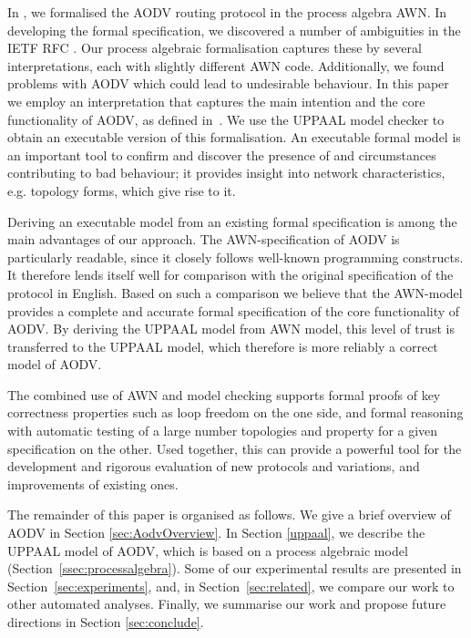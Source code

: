\documentclass[conference,twoside]{IEEEtran}
\newcommand{\awn}{AWN\xspace}
\begin{document}
In \cite{TR11}, we formalised the AODV routing protocol in the process algebra \awn.
In developing the formal specification, we
discovered a number of ambiguities in the IETF RFC \cite{rfc3561}.
Our process algebraic formalisation captures these by several
interpretations, each with slightly different {\awn} code.
Additionally, we found problems with AODV which could lead to undesirable behaviour.
In this paper we employ an interpretation that captures the main intention and
the core functionality of AODV, as defined in~\cite{rfc3561}.
We use the UPPAAL model checker to obtain an executable version of this formalisation.
An executable formal model is  an important tool to confirm and
 discover the presence of and circumstances contributing to  bad behaviour;
it provides insight into network characteristics, e.g. topology forms, which give rise to it.

Deriving an executable model from an existing formal specification is among the
main advantages of our approach.
The {\awn}-specification of AODV is particularly readable, since it  closely
 follows well-known programming constructs. It therefore lends itself
 well for comparison with the original specification of the protocol
 in English.  Based on such a comparison we believe that
 the \awn-model provides a complete and accurate formal
specification of the core functionality of AODV\@.
 By deriving the UPPAAL model from \awn model, this level of trust is
 transferred to the UPPAAL model, which therefore is more reliably a
 correct model of AODV.

The combined use of \awn
 and model checking supports
formal proofs of key correctness
 properties such as loop freedom on the one side, and
formal reasoning with automatic  testing of a large number
topologies and property for a given specification on the other.
Used together, this can provide a powerful tool for the development
and rigorous evaluation of new protocols and variations, and
improvements of existing ones.


The remainder of this paper is organised as follows.
We give a brief overview of AODV
in Section \ref{sec:AodvOverview}.
In Section \ref{uppaal}, we describe the UPPAAL model of AODV, which is
based on a process algebraic model (Section~\ref{ssec:processalgebra}).
Some of our experimental results are presented in Section~\ref{sec:experiments},
and, in Section~\ref{sec:related}, we compare our work to other automated analyses.
Finally, we summarise our work and propose future directions in Section \ref{sec:conclude}.
\end{document}

